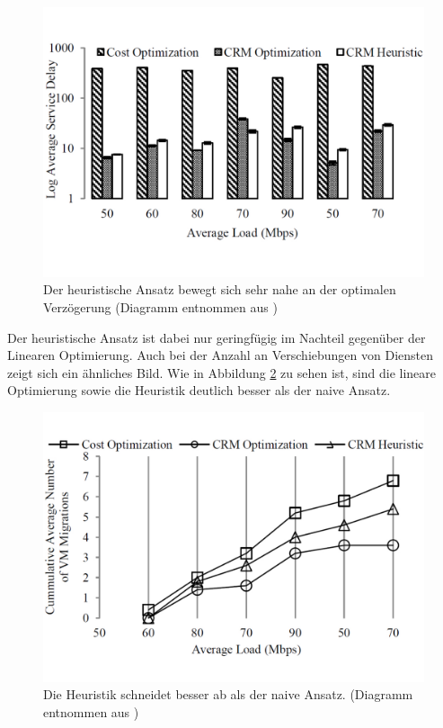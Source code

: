\documentclass[conference]{IEEEtran}
\begin{document}
\begin{figure}[h!]
	\centering
	\includegraphics[trim=0 3cm 0 1cm,scale=0.25]{grafik/delay.pdf}
	\caption{Der heuristische Ansatz bewegt sich sehr nahe an der optimalen Verzögerung
	(Diagramm entnommen aus \cite{IEEEhowto:orig})}
	\label{img:delay}
\end{figure}

Der heuristische Ansatz ist dabei nur geringfügig im Nachteil gegenüber der Linearen Optimierung. Auch bei der Anzahl an Verschiebungen von Diensten zeigt sich ein ähnliches Bild. Wie in Abbildung \ref{img:VMMIG} zu sehen ist, sind die lineare Optimierung sowie die Heuristik deutlich besser als der naive Ansatz.

\begin{figure}[h!]
	\centering
	\includegraphics[trim=0 3cm 0 1cm,scale=0.25]{grafik/VMMIG.pdf}
	\caption{Die Heuristik schneidet besser ab als der naive Ansatz.
	(Diagramm entnommen aus \cite{IEEEhowto:orig})}
	\label{img:VMMIG}
\end{figure}
\end{document}
